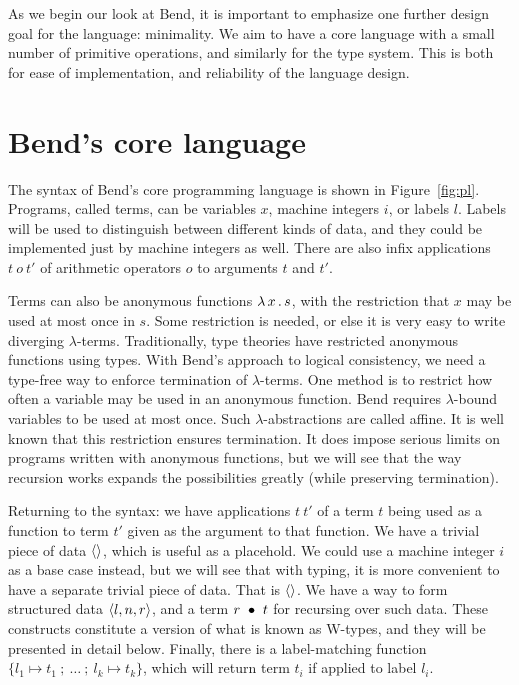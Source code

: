 \documentclass{article}
\begin{document}
As we begin our look at Bend, it is important to emphasize one further
design goal for the language: minimality.  We aim to have a core
language with a small number of primitive operations, and similarly
for the type system.  This is both for ease of implementation, and
reliability of the language design.

\section{Bend's core language}

The syntax of Bend's core programming language is shown in
Figure~\ref{fig:pl}.  Programs, called terms, can be variables $x$,
machine integers $i$, or labels $l$.  Labels will be used to
distinguish between different kinds of data, and they could be
implemented just by machine integers as well.  There are also infix
applications $t\ o\ t'$ of arithmetic operators $o$ to arguments $t$
and $t'$.

Terms can also be anonymous
functions $\lambda\, x\, .\, s$, with the restriction that $x$ may be used at
most once in $s$.  Some restriction is needed, or else it is very easy
to write diverging $\lambda$-terms.  Traditionally, type theories have
restricted anonymous functions using types.  With Bend's approach to
logical consistency, we need a type-free way to enforce termination of
$\lambda$-terms.  One method is to restrict how often a variable may
be used in an anonymous function.  Bend requires $\lambda$-bound
variables to be used at most once.  Such $\lambda$-abstractions are
called affine.  It is well known that this restriction ensures
termination.  It does impose serious limits on programs written with
anonymous functions, but we will see that the way recursion works
expands the possibilities greatly (while preserving termination).

Returning to the syntax: we have applications $t\ t'$ of a term $t$
being used as a function to term $t'$ given as the argument to that
function.  We have a trivial piece of data $\langle\rangle$, which is useful as
a placehold.  We could use a machine integer $i$ as a base case
instead, but we will see that with typing, it is more convenient to
have a separate trivial piece of data.  That is $\langle\rangle$.  We have a
way to form structured data $\langle l , n, r \rangle$, and a term $r\ \bullet\ t$
for recursing over such data.  These constructs constitute a version of
what is known as W-types, and they will be presented in detail below.
Finally, there is a label-matching function $\{ l_1 \mapsto t_1\ ;\ \ldots\ ;\ l_k\mapsto t_k \}$,
which will return term $t_i$ if applied to label $l_i$. 
\end{document}
